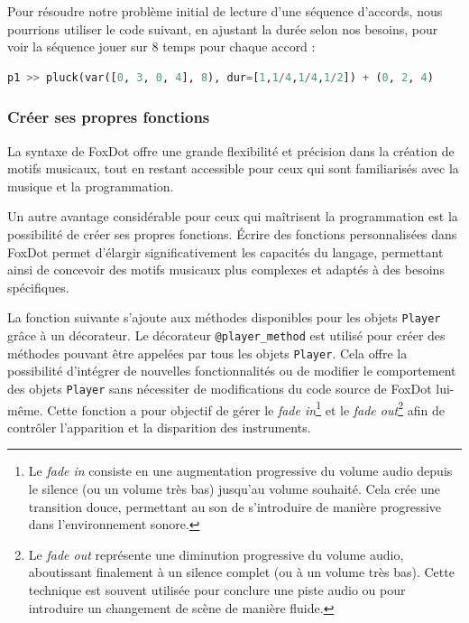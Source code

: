 Pour résoudre notre problème initial de lecture d'une séquence d'accords, nous pourrions utiliser le code suivant, en ajustant la durée selon nos besoins, pour voir la séquence jouer sur 8 temps pour chaque accord :

\begin{minipage}{\linewidth}
\begin{lstlisting}[language=Python, caption=Variables temporelles,captionpos=b,frame=single]
p1 >> pluck(var([0, 3, 0, 4], 8), dur=[1,1/4,1/4,1/2]) + (0, 2, 4)
\end{lstlisting}
\end{minipage}



\subsubsection*{Créer ses propres fonctions}
La syntaxe de FoxDot offre une grande flexibilité et précision dans la création de motifs musicaux, tout en restant accessible pour ceux qui sont familiarisés avec la musique et la programmation.


Un autre avantage considérable pour ceux qui maîtrisent la programmation est la possibilité de créer ses propres fonctions. Écrire des fonctions personnalisées dans FoxDot permet d'élargir significativement les capacités du langage, permettant ainsi de concevoir des motifs musicaux plus complexes et adaptés à des besoins spécifiques.

La fonction suivante s'ajoute aux méthodes disponibles pour les objets \lstinline{Player} grâce à un décorateur. Le décorateur \lstinline{@player_method} est utilisé pour créer des méthodes pouvant être appelées par tous les objets \lstinline{Player}. Cela offre la possibilité d'intégrer de nouvelles fonctionnalités ou de modifier le comportement des objets \lstinline{Player} sans nécessiter de modifications du code source de FoxDot lui-même. Cette fonction a pour objectif de gérer le \textit{fade in}\footnote{Le \textit{fade in} consiste en une augmentation progressive du volume audio depuis le silence (ou un volume très bas) jusqu'au volume souhaité. Cela crée une transition douce, permettant au son de s'introduire de manière progressive dans l'environnement sonore.} et le \textit{fade out}\footnote{Le \textit{fade out} représente une diminution progressive du volume audio, aboutissant finalement à un silence complet (ou à un volume très bas). Cette technique est souvent utilisée pour conclure une piste audio ou pour introduire un changement de scène de manière fluide.} afin de contrôler l'apparition et la disparition des instruments.

